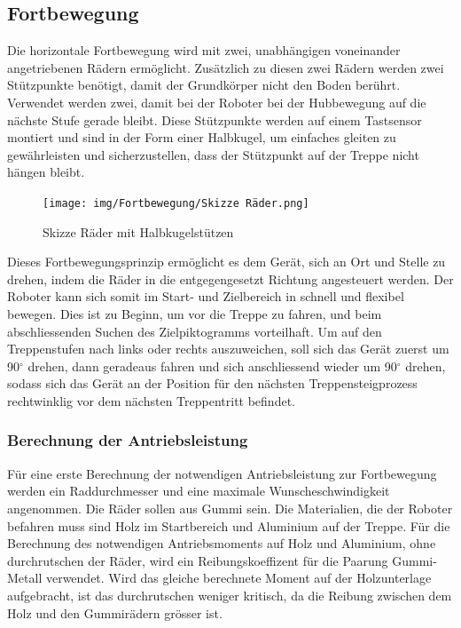 \newpage
\subsection{Fortbewegung}
\label{sec:Fortbewegung}
Die horizontale Fortbewegung wird mit zwei, unabhängigen voneinander angetriebenen Rädern ermöglicht. Zusätzlich zu diesen zwei Rädern werden zwei Stützpunkte benötigt, damit der Grundkörper nicht den Boden berührt. Verwendet werden zwei, damit bei der Roboter bei der Hubbewegung auf die nächste Stufe gerade bleibt. Diese Stützpunkte werden auf einem Tastsensor montiert und sind in der Form einer Halbkugel, um einfaches gleiten zu gewährleisten und sicherzustellen, dass der Stützpunkt auf der Treppe nicht hängen bleibt.

\begin{figure}[H]
  \texttt{[image: img/Fortbewegung/Skizze Räder.png]}
  \centering
  \caption{Skizze Räder mit Halbkugelstützen}
\end{figure}

Dieses Fortbewegungsprinzip ermöglicht es dem Gerät, sich an Ort und Stelle zu drehen, indem die Räder in die entgegengesetzt Richtung angesteuert werden. Der Roboter kann sich somit im Start- und Zielbereich in schnell und flexibel bewegen. Dies ist zu Beginn, um vor die Treppe zu fahren, und beim abschliessenden Suchen des Zielpiktogramms vorteilhaft. Um auf den Treppenstufen nach links oder rechts auszuweichen, soll sich das Gerät zuerst um 90$^\circ$ drehen, dann geradeaus fahren und sich anschliessend wieder um 90$^\circ$ drehen, sodass sich das Gerät an der Position für den nächsten Treppensteigprozess rechtwinklig vor dem nächsten Treppentritt befindet.

\newpage

\subsubsection{Berechnung der Antriebsleistung}

Für eine erste Berechnung der notwendigen Antriebsleistung zur Fortbewegung werden ein Raddurchmesser und eine maximale Wunscheschwindigkeit angenommen. Die Räder sollen aus Gummi sein. Die Materialien, die der Roboter befahren muss sind Holz im Startbereich und Aluminium auf der Treppe. Für die Berechnung des notwendigen Antriebsmoments auf Holz und Aluminium, ohne durchrutschen der Räder, wird ein Reibungskoeffizent \cite{Reibung} für die Paarung Gummi-Metall verwendet. Wird das gleiche berechnete Moment auf der Holzunterlage aufgebracht, ist das durchrutschen weniger kritisch, da die Reibung zwischen dem Holz und den Gummirädern grösser ist.

